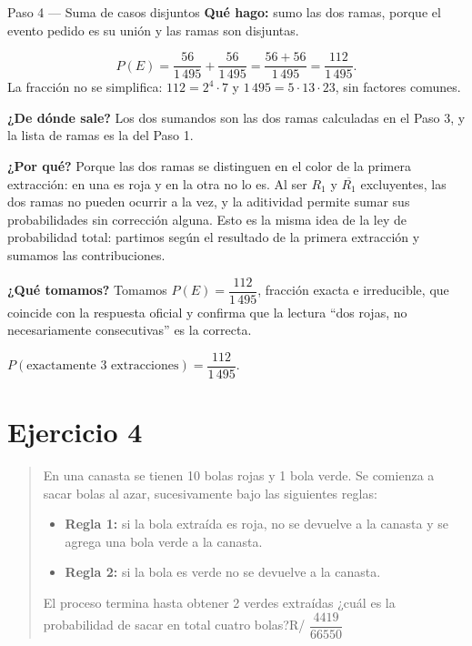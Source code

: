 \documentclass[11pt]{article}
\begin{document}
\begin{paso}{Paso 4 --- Suma de casos disjuntos}
\textbf{Qué hago:} sumo las dos ramas, porque el evento pedido es su unión y las ramas son disjuntas.

\[
P(E)=\frac{56}{1\,495}+\frac{56}{1\,495}=\frac{56+56}{1\,495}=\frac{112}{1\,495}.
\]
La fracción no se simplifica: $112=2^4\cdot 7$ y $1\,495=5\cdot 13\cdot 23$, sin factores comunes.

\textbf{¿De dónde sale?} Los dos sumandos son las dos ramas calculadas en el Paso 3, y la lista de ramas es la del Paso 1.

\textbf{¿Por qué?} Porque las dos ramas se distinguen en el color de la primera extracción: en una es roja y en la otra no lo es. Al ser $R_1$ y $\overline{R_1}$ excluyentes, las dos ramas no pueden ocurrir a la vez, y la aditividad permite sumar sus probabilidades sin corrección alguna. Esto es la misma idea de la ley de probabilidad total: partimos según el resultado de la primera extracción y sumamos las contribuciones.

\textbf{¿Qué tomamos?} Tomamos $P(E)=\dfrac{112}{1\,495}$, fracción exacta e irreducible, que coincide con la respuesta oficial y confirma que la lectura ``dos rojas, no necesariamente consecutivas'' es la correcta.
\end{paso}

\begin{resp}
$P(\text{exactamente 3 extracciones})=\dfrac{112}{1\,495}$.
\end{resp}

\section*{Ejercicio 4}

\begin{quote}
En una canasta se tienen 10 bolas rojas y 1 bola verde. Se comienza a sacar bolas al azar, sucesivamente bajo las siguientes reglas:
\begin{itemize}[leftmargin=1.6em]
\item \textbf{Regla 1:} si la bola extraída es roja, no se devuelve a la canasta y se agrega una bola verde a la canasta.
\item \textbf{Regla 2:} si la bola es verde no se devuelve a la canasta.
\end{itemize}
El proceso termina hasta obtener 2 verdes extraídas ¿cuál es la probabilidad de sacar en total cuatro bolas?\hfill R/ $\dfrac{4419}{66550}$
\end{quote}
\end{document}
